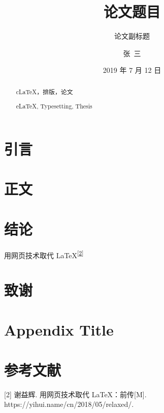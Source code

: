 \documentclass{hnuthesis}
\title{论文题目}
\subtitle{论文副标题}
\author{张\ 三}
\date{2019 年 7 月 12 日}
\begin{document}
\frontmatter
\maketitle

\begin{abstract}{c}{\LaTeX{}，排版，论文}
\zhlipsum[1]
\end{abstract}

\begin{abstract}{e}{\LaTeX{}, Typesetting, Thesis}
\lipsum[1]
\end{abstract}
 
\tableofcontents

\mainmatter

\chapter{引言}
\zhlipsum[1-2]

\chapter{正文}
\zhlipsum[1-15]

\chapter{结论}
用网页技术取代 \LaTeX{}\textsuperscript{{[}\hyperlink{ref-weborlatex}{2}{]}}

\backmatter

\chapter*{致谢}
\zhlipsum[1]

\appendix
\chapter{Appendix Title}
\zhlipsum[1]

\chapter*{参考文献}
\leavevmode\hypertarget{ref-weborlatex}{}%
{[}2{]} 谢益辉. 用网页技术取代 LaTeX：前传{[}M{]}.
https://yihui.name/cn/2018/05/relaxed/.
\end{document}
